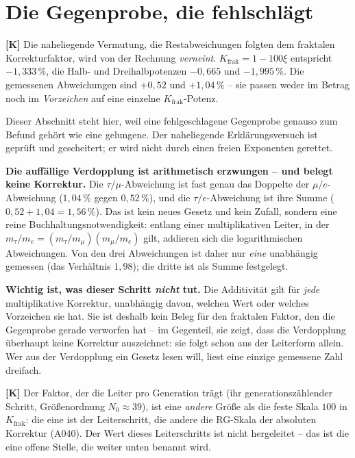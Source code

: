 \section{Die Gegenprobe, die fehlschlägt}

\textbf{[K]} Die naheliegende Vermutung, die Restabweichungen folgten dem
fraktalen Korrekturfaktor, wird von der Rechnung \emph{verneint}.
$K_\text{frak} = 1-100\xi$ entspricht $-1{,}333\,\%$, die Halb- und
Dreihalbpotenzen $-0{,}665$ und $-1{,}995\,\%$. Die gemessenen Abweichungen
sind $+0{,}52$ und $+1{,}04\,\%$ -- sie passen weder im Betrag noch im
\emph{Vorzeichen} auf eine einzelne $K_\text{frak}$-Potenz.

Dieser Abschnitt steht hier, weil eine fehlgeschlagene Gegenprobe genauso zum
Befund gehört wie eine gelungene. Der naheliegende Erklärungsversuch ist
geprüft und gescheitert; er wird nicht durch einen freien Exponenten gerettet.

\textbf{Die auffällige Verdopplung ist arithmetisch erzwungen -- und belegt
keine Korrektur.} Die $\tau/\mu$-Abweichung ist fast genau das Doppelte der
$\mu/e$-Abweichung ($1{,}04\,\%$ gegen $0{,}52\,\%$), und die $\tau/e$-Abweichung
ist ihre Summe ($0{,}52 + 1{,}04 = 1{,}56\,\%$). Das ist kein neues Gesetz und
kein Zufall, sondern eine reine Buchhaltungsnotwendigkeit: entlang einer
multiplikativen Leiter, in der $m_\tau/m_e = (m_\tau/m_\mu)(m_\mu/m_e)$ gilt,
addieren sich die logarithmischen Abweichungen. Von den drei Abweichungen ist
daher nur \emph{eine} unabhängig gemessen (das Verhältnis $1{,}98$); die dritte
ist als Summe festgelegt.

\textbf{Wichtig ist, was dieser Schritt \emph{nicht} tut.} Die Additivität gilt
für \emph{jede} multiplikative Korrektur, unabhängig davon, welchen Wert oder
welches Vorzeichen sie hat. Sie ist deshalb kein Beleg für den fraktalen Faktor,
den die Gegenprobe gerade verworfen hat -- im Gegenteil, sie zeigt, dass die
Verdopplung überhaupt keine Korrektur auszeichnet: sie folgt schon aus der
Leiterform allein. Wer aus der Verdopplung ein Gesetz lesen will, liest eine
einzige gemessene Zahl dreifach.

\textbf{[K]} Der Faktor, der die Leiter pro Generation trägt (ihr
generationszählender Schritt, Größenordnung $N_0 \approx 39$), ist eine
\emph{andere} Größe als die feste Skala $100$ in $K_\text{frak}$: die eine ist
der Leiterschritt, die andere die RG-Skala der absoluten Korrektur (A040). Der
Wert dieses Leiterschritts ist nicht hergeleitet -- das ist die eine offene
Stelle, die weiter unten benannt wird.

